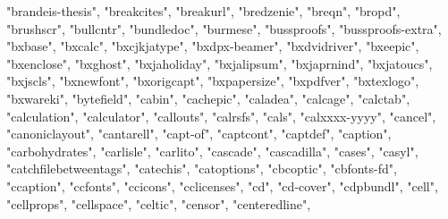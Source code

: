 \documentclass[
]{article}
\newenvironment{Shaded}{\begin{snugshade}}{\end{snugshade}}
\newcommand{\NormalTok}[1]{#1}
\newcommand{\StringTok}[1]{\textcolor[rgb]{0.31,0.60,0.02}{#1}}
\begin{document}
\begin{Shaded}
\begin{Highlighting}[]
\StringTok{"brandeis{-}thesis"}\NormalTok{, }\StringTok{"breakcites"}\NormalTok{, }\StringTok{"breakurl"}\NormalTok{, }\StringTok{"bredzenie"}\NormalTok{, }\StringTok{"breqn"}\NormalTok{, }
\StringTok{"bropd"}\NormalTok{, }\StringTok{"brushscr"}\NormalTok{, }\StringTok{"bullcntr"}\NormalTok{, }\StringTok{"bundledoc"}\NormalTok{, }\StringTok{"burmese"}\NormalTok{, }\StringTok{"bussproofs"}\NormalTok{, }
\StringTok{"bussproofs{-}extra"}\NormalTok{, }\StringTok{"bxbase"}\NormalTok{, }\StringTok{"bxcalc"}\NormalTok{, }\StringTok{"bxcjkjatype"}\NormalTok{, }\StringTok{"bxdpx{-}beamer"}\NormalTok{, }
\StringTok{"bxdvidriver"}\NormalTok{, }\StringTok{"bxeepic"}\NormalTok{, }\StringTok{"bxenclose"}\NormalTok{, }\StringTok{"bxghost"}\NormalTok{, }\StringTok{"bxjaholiday"}\NormalTok{, }
\StringTok{"bxjalipsum"}\NormalTok{, }\StringTok{"bxjaprnind"}\NormalTok{, }\StringTok{"bxjatoucs"}\NormalTok{, }\StringTok{"bxjscls"}\NormalTok{, }\StringTok{"bxnewfont"}\NormalTok{, }
\StringTok{"bxorigcapt"}\NormalTok{, }\StringTok{"bxpapersize"}\NormalTok{, }\StringTok{"bxpdfver"}\NormalTok{, }\StringTok{"bxtexlogo"}\NormalTok{, }\StringTok{"bxwareki"}\NormalTok{, }
\StringTok{"bytefield"}\NormalTok{, }\StringTok{"cabin"}\NormalTok{, }\StringTok{"cachepic"}\NormalTok{, }\StringTok{"caladea"}\NormalTok{, }\StringTok{"calcage"}\NormalTok{, }\StringTok{"calctab"}\NormalTok{, }
\StringTok{"calculation"}\NormalTok{, }\StringTok{"calculator"}\NormalTok{, }\StringTok{"callouts"}\NormalTok{, }\StringTok{"calrsfs"}\NormalTok{, }\StringTok{"cals"}\NormalTok{, }\StringTok{"calxxxx{-}yyyy"}\NormalTok{, }
\StringTok{"cancel"}\NormalTok{, }\StringTok{"canoniclayout"}\NormalTok{, }\StringTok{"cantarell"}\NormalTok{, }\StringTok{"capt{-}of"}\NormalTok{, }\StringTok{"captcont"}\NormalTok{, }
\StringTok{"captdef"}\NormalTok{, }\StringTok{"caption"}\NormalTok{, }\StringTok{"carbohydrates"}\NormalTok{, }\StringTok{"carlisle"}\NormalTok{, }\StringTok{"carlito"}\NormalTok{, }
\StringTok{"cascade"}\NormalTok{, }\StringTok{"cascadilla"}\NormalTok{, }\StringTok{"cases"}\NormalTok{, }\StringTok{"casyl"}\NormalTok{, }\StringTok{"catchfilebetweentags"}\NormalTok{, }
\StringTok{"catechis"}\NormalTok{, }\StringTok{"catoptions"}\NormalTok{, }\StringTok{"cbcoptic"}\NormalTok{, }\StringTok{"cbfonts{-}fd"}\NormalTok{, }\StringTok{"ccaption"}\NormalTok{, }
\StringTok{"ccfonts"}\NormalTok{, }\StringTok{"ccicons"}\NormalTok{, }\StringTok{"cclicenses"}\NormalTok{, }\StringTok{"cd"}\NormalTok{, }\StringTok{"cd{-}cover"}\NormalTok{, }\StringTok{"cdpbundl"}\NormalTok{, }
\StringTok{"cell"}\NormalTok{, }\StringTok{"cellprops"}\NormalTok{, }\StringTok{"cellspace"}\NormalTok{, }\StringTok{"celtic"}\NormalTok{, }\StringTok{"censor"}\NormalTok{, }\StringTok{"centeredline"}\NormalTok{, }

\end{Highlighting}
\end{Shaded}
\end{document}
